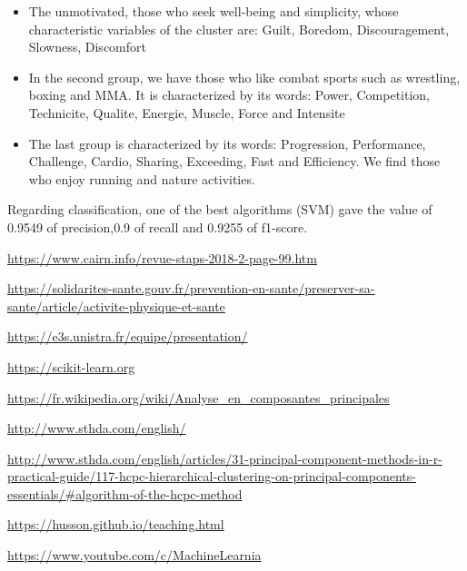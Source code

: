 \documentclass[12pt]{article}
\begin{document}
\begin{itemize}

\item The unmotivated, those who seek well-being and simplicity, whose characteristic variables of the cluster are:  Guilt, Boredom, Discouragement, Slowness, Discomfort 

\item In the second group, we have those who like combat sports such as wrestling, boxing and MMA. It is characterized by its words: Power, Competition, Technicite, Qualite, Energie, Muscle, Force and Intensite 

\item  The last group is characterized by its words: Progression, Performance, 
Challenge, Cardio, Sharing, Exceeding, Fast and Efficiency. 
We find those who enjoy running and nature activities. 

\end{itemize}

\noindent Regarding classification, one of the best algorithms (SVM) gave the value of 0.9549 of precision,0.9 of recall and 0.9255 of f1-score.


\begin{thebibliography}{9}

\url{https://www.cairn.info/revue-staps-2018-2-page-99.htm}


\url{https://solidarites-sante.gouv.fr/prevention-en-sante/preserver-sa-sante/article/activite-physique-et-sante}

\url{https://e3s.unistra.fr/equipe/presentation/}

\url{https://scikit-learn.org}

\bibitem{}
\url{https://fr.wikipedia.org/wiki/Analyse_en_composantes_principales}


\url{http://www.sthda.com/english/}

\url{http://www.sthda.com/english/articles/31-principal-component-methods-in-r-practical-guide/117-hcpc-hierarchical-clustering-on-principal-components-essentials/#algorithm-of-the-hcpc-method}


\url{https://husson.github.io/teaching.html}


\url{https://www.youtube.com/c/MachineLearnia}



\end{thebibliography}
\end{document}
